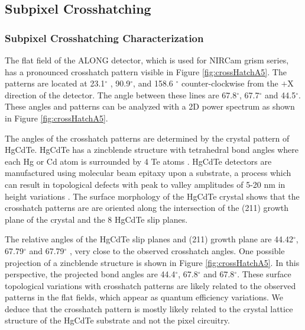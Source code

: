 \documentclass{aastex62}
\newcommand{\degree}{^\circ}
\begin{document}
\subsection{Subpixel Crosshatching}

\subsubsection{Subpixel Crosshatching Characterization}
The flat field of the ALONG detector, which is used for NIRCam grism series, has a pronounced crosshatch pattern visible in Figure \ref{fig:crossHatchA5}.
The patterns are located at 23.1$\degree$ , 90.9$\degree$, and 158.6 $\degree$ counter-clockwise from the $+$X direction of the detector.
The angle between these lines are 67.8$\degree$, 67.7$\degree$ and 44.5$\degree$.
These angles and patterns can be analyzed with a 2D power spectrum as shown in Figure \ref{fig:crossHatchA5}.

The angles of the crosshatch patterns are determined by the crystal pattern of HgCdTe.
HgCdTe has a zincblende structure with tetrahedral bond angles where each Hg or Cd atom is surrounded by 4 Te atoms \citep{gemain2012mercVacanciesHgCdTe}.
HgCdTe detectors are manufactured using molecular beam epitaxy upon a substrate, a process which can result in topological defects with peak to valley amplitudes of 5-20 nm in height variations \citep{chang2008surfaceMorphologyHgCdTe}.
The surface morphology of the HgCdTe crystal shows that the crosshatch patterns are are oriented along the intersection of the (211) growth plane of the crystal and the 8 HgCdTe slip planes.

The relative angles of the HgCdTe slip planes and (211) growth plane are 44.42$\degree$, 67.79$\degree$ and 67.79$\degree$ \citep{chang2008surfaceMorphologyHgCdTe}, very close to the observed crosshatch angles.
One possible projection of a zincblende structure is shown in Figure \ref{fig:crossHatchA5}.
In this perspective, the projected bond angles are 44.4$\degree$, 67.8$\degree$ and 67.8$\degree$.
These surface topological variations with crosshatch patterns are likely related to the observed patterns in the flat fields, which appear as quantum efficiency variations.
We deduce that the crosshatch pattern is mostly likely related to the crystal lattice structure of the HgCdTe substrate and not the pixel circuitry.
\end{document}
